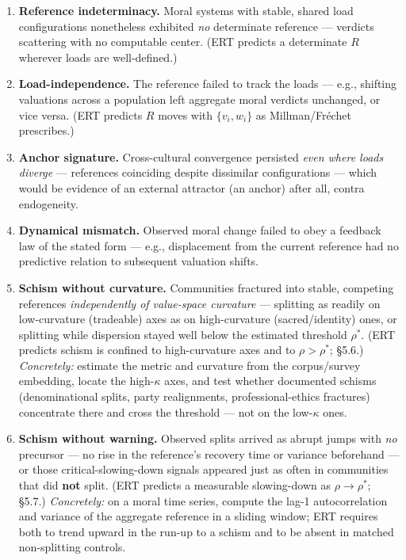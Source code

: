 \documentclass[
]{article}
\providecommand{\tightlist}{%
  \setlength{\itemsep}{0pt}\setlength{\parskip}{0pt}}
\begin{document}
\begin{enumerate}
\def\labelenumi{\arabic{enumi}.}
\tightlist
\item
  \textbf{Reference indeterminacy.} Moral systems with stable, shared
  load configurations nonetheless exhibited \emph{no} determinate
  reference --- verdicts scattering with no computable center. (ERT
  predicts a determinate \(R\) wherever loads are well-defined.)
\item
  \textbf{Load-independence.} The reference failed to track the loads
  --- e.g., shifting valuations across a population left aggregate moral
  verdicts unchanged, or vice versa. (ERT predicts \(R\) moves with
  \(\{v_i, w_i\}\) as Millman/Fréchet prescribes.)
\item
  \textbf{Anchor signature.} Cross-cultural convergence persisted
  \emph{even where loads diverge} --- references coinciding despite
  dissimilar configurations --- which would be evidence of an external
  attractor (an anchor) after all, contra endogeneity.
\item
  \textbf{Dynamical mismatch.} Observed moral change failed to obey a
  feedback law of the stated form --- e.g., displacement from the
  current reference had no predictive relation to subsequent valuation
  shifts.
\item
  \textbf{Schism without curvature.} Communities fractured into stable,
  competing references \emph{independently of value-space curvature} ---
  splitting as readily on low-curvature (tradeable) axes as on
  high-curvature (sacred/identity) ones, or splitting while dispersion
  stayed well below the estimated threshold \(\rho^{*}\). (ERT predicts
  schism is confined to high-curvature axes and to \(\rho>\rho^{*}\);
  §5.6.) \emph{Concretely:} estimate the metric and curvature from the
  corpus/survey embedding, locate the high-\(\kappa\) axes, and test
  whether documented schisms (denominational splits, party realignments,
  professional-ethics fractures) concentrate there and cross the
  threshold --- not on the low-\(\kappa\) ones.
\item
  \textbf{Schism without warning.} Observed splits arrived as abrupt
  jumps with \emph{no} precursor --- no rise in the reference's recovery
  time or variance beforehand --- or those critical-slowing-down signals
  appeared just as often in communities that did \textbf{not} split.
  (ERT predicts a measurable slowing-down as \(\rho\to\rho^{*}\); §5.7.)
  \emph{Concretely:} on a moral time series, compute the lag-1
  autocorrelation and variance of the aggregate reference in a sliding
  window; ERT requires both to trend upward in the run-up to a schism
  and to be absent in matched non-splitting controls.
\end{enumerate}
\end{document}
